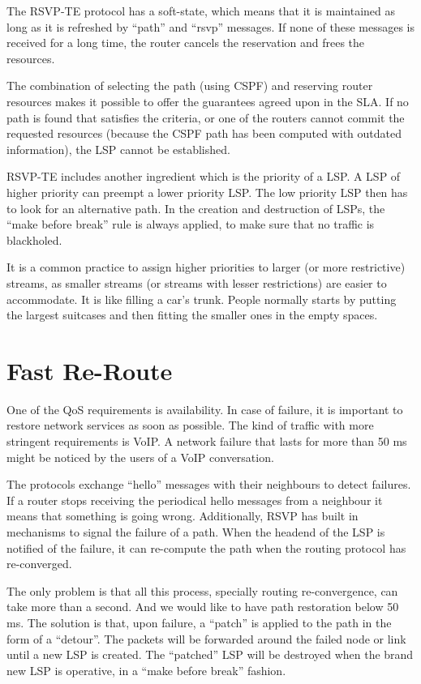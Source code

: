 The RSVP-TE protocol has a soft-state, which means that it is maintained as long as it is refreshed by ``path'' and ``rsvp'' messages.
If none of these messages is received for a long time, the router cancels the reservation and frees the resources.

The combination of selecting the path (using CSPF) and reserving router resources makes it possible to offer the guarantees agreed upon in the SLA.
If no path is found that satisfies the criteria, or one of the routers cannot commit the requested resources (because the CSPF path has been computed with outdated information), the LSP cannot be established.

RSVP-TE includes another ingredient which is the priority of a LSP.
A LSP of higher priority can preempt a lower priority LSP.
The low priority LSP then has to look for an alternative path.
In the creation and destruction of LSPs, the ``make before break'' rule is always applied, to make sure that no traffic is blackholed.

It is a common practice to assign higher priorities to larger (or more restrictive) streams, as smaller streams (or streams with lesser restrictions) are easier to accommodate.
It is like filling a car's trunk. 
People normally starts by putting the largest suitcases and then fitting the smaller ones in the empty spaces.

\section{Fast Re-Route}

One of the QoS requirements is availability.
In case of failure, it is important to restore network services as soon as possible.
The kind of traffic with more stringent requirements is VoIP.
A network failure that lasts for more than 50 ms might be noticed by the users of a VoIP conversation.

The protocols exchange ``hello'' messages with their neighbours to detect failures.
If a router stops receiving the periodical hello messages from a neighbour it means that something is going wrong.
Additionally, RSVP has built in mechanisms to signal the failure of a path.
When the headend of the LSP is notified of the failure, it can re-compute the path when the routing protocol has re-converged.

The only problem is that all this process, specially routing re-convergence, can take more than a second.
And we would like to have path restoration below 50 ms.
The solution is that, upon failure, a ``patch'' is applied to the path in the form of a ``detour''.
The packets will be forwarded around the failed node or link until a new LSP is created.
The ``patched'' LSP will be destroyed when the brand new LSP is operative, in a ``make before break'' fashion.

